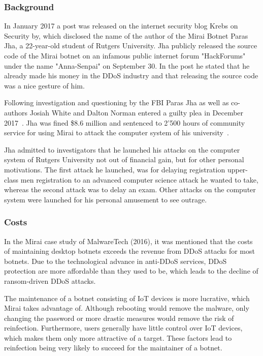 \subsubsection{Background}
In January 2017 a post was released on the internet security blog Krebs on Security by, which disclosed the name of the author of the Mirai Botnet Paras Jha, a 22-year-old student of Rutgers University.
Jha publicly released the source code of the Mirai botnet on an infamous public internet forum "HackForums" under the name "Anna-Senpai" on September 30.
In the post he stated that he already made his money in the DDoS industry and that releasing the source code was a nice gesture of him.\cite{Krebs17}

Following investigation and questioning by the FBI Paras Jha as well as co-authors Josiah White and Dalton Norman entered a guilty plea in December 2017~\cite{USDepartment17}.
Jha was fined \$8.6 million and sentenced to 2'500 hours of community service for using Mirai to attack the computer system of his university~\cite{Krebs18}.

Jha admitted to investigators that he launched his attacks on the computer system of Rutgers University not out of financial gain, but for other personal motivations.
The first attack he launched, was for delaying registration upper-class men registration to an advanced computer science attack he wanted to take, whereas the second attack was to delay an exam.
Other attacks on the computer system were launched for his personal amusement to see outrage.\cite{Krebs18}

\subsubsection{Costs}
In the Mirai case study of MalwareTech (2016), it was mentioned that the costs of maintaining desktop botnets exceeds the revenue from DDoS attacks for most botnets.
Due to the technological advance in anti-DDoS services, DDoS protection are more affordable than they used to be, which leads to the decline of ransom-driven DDoS attacks.\cite{MalwareTech16}

The maintenance of a botnet consisting of IoT devices is more lucrative, which Mirai takes advantage of.
Although rebooting would remove the malware, only changing the password or more drastic measures would remove the risk of reinfection.
Furthermore, users generally have little control over IoT devices, which makes them only more attractive of a target.
These factors lead to reinfection being very likely to succeed for the maintainer of a botnet.\cite{MalwareTech16}

